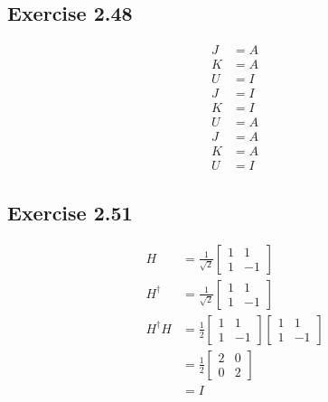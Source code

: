 \documentclass{article}
\begin{document}
\subsection*{Exercise 2.48}

\begin{align*}
  J & = A \\
  K & = A \\
  U & = I \\
  J & = I \\
  K & = I \\
  U & = A \\
  J & = A \\
  K & = A \\
  U & = I
\end{align*}

\subsection*{Exercise 2.51}

\begin{align*}
  H           & = \frac{1}{\sqrt{2}} \begin{bmatrix}
                                       1 & 1  \\
                                       1 & -1
                                     \end{bmatrix}        \\
  H^\dagger   & = \frac{1}{\sqrt{2}} \begin{bmatrix}
                                       1 & 1  \\
                                       1 & -1
                                     \end{bmatrix}        \\
  H^\dagger H & = \frac{1}{2} \begin{bmatrix}
                                1 & 1  \\
                                1 & -1
                              \end{bmatrix} \begin{bmatrix}
                                              1 & 1  \\
                                              1 & -1
                                            \end{bmatrix} \\
              & = \frac{1}{2} \begin{bmatrix}
                                2 & 0 \\
                                0 & 2
                              \end{bmatrix}               \\
              & = I
\end{align*}
\end{document}
